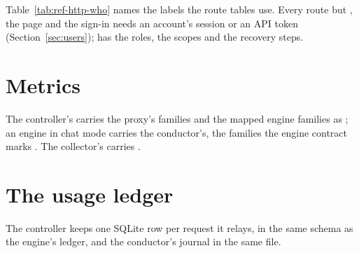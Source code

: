 Table~\ref{tab:ref-http-who} names the labels the route tables use. Every route but , the page and the sign-in needs an account's session or an API token (Section~\ref{sec:users});  has the roles, the scopes and the recovery steps.













\section{Metrics}

The controller's  carries the proxy's families and the mapped engine families as ; an engine in chat mode carries the conductor's, the families the engine contract marks . The collector's  carries .



\section{The usage ledger}\label{sec:ledger}

The controller keeps one SQLite row per request it relays, in the same schema as the engine's ledger, and the conductor's journal in the same file.


